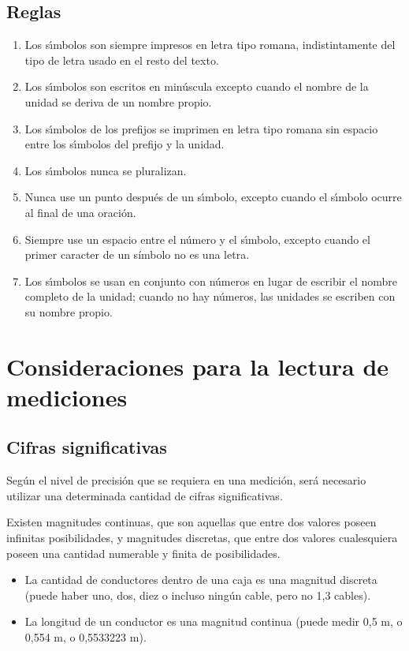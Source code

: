 \subsection{Reglas}
\begin{enumerate}
	\item Los sı́mbolos son siempre impresos en letra tipo romana, indistintamente del tipo de letra usado en el resto del texto.
	\item Los sı́mbolos son escritos en minúscula excepto cuando el nombre de la unidad se deriva de un nombre propio.
	\item Los sı́mbolos de los prefijos se imprimen en letra tipo romana sin espacio entre los sı́mbolos del prefijo y la unidad.
	\item Los sı́mbolos nunca se pluralizan.
	\item Nunca use un punto después de un sı́mbolo, excepto cuando el sı́mbolo ocurre al final de una oración.
	\item Siempre use un espacio entre el número y el sı́mbolo, excepto cuando el primer caracter de un símbolo no es una letra.
	\item Los sı́mbolos se usan en conjunto con números en lugar de escribir el nombre completo de la unidad; cuando no hay números, las unidades se escriben con su nombre propio.
	
\end{enumerate}
\section{Consideraciones para la lectura de mediciones}
\subsection{Cifras significativas}
Según el nivel de precisión que se requiera en una medición, será necesario utilizar una determinada cantidad de cifras significativas.

Existen magnitudes continuas, que son aquellas que entre dos valores poseen infinitas posibilidades, y magnitudes discretas, que entre dos valores cualesquiera poseen una cantidad numerable y finita de posibilidades.

\begin{ejemplo}
	\begin{itemize}
		\item La cantidad de conductores dentro de una caja es una magnitud discreta (puede haber uno, dos, diez o incluso ningún cable, pero no 1,3 cables).
		\item La longitud de un conductor es una magnitud continua (puede medir 0,5 m, o 0,554 m, o 0,5533223 m).
	\end{itemize}
\end{ejemplo}

